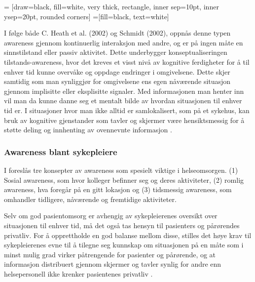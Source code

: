  = [draw=black, fill=white, very thick,
    rectangle, inner sep=10pt, inner ysep=20pt, rounded corners]
 =[fill=black, text=white]
%

\noindent
I følge både C. Heath et al. (2002) og Schmidt (2002), oppnås denne typen awareness gjennom kontinuerlig interaksjon med andre, og er på ingen måte en sinnstilstand eller passiv aktivitet. Dette underbygger konseptualiseringen tilstands-awareness, hvor det kreves et visst nivå av kognitive ferdigheter for å til enhver tid kunne overvåke og oppdage endringer i omgivelsene. Dette skjer samtidig som man synliggjør for omgivelsene ens egen nåværende situasjon gjennom implisitte eller eksplisitte signaler. Med informasjonen man henter inn vil man da kunne danne seg et mentalt bilde av hvordan situasjonen til enhver tid er. I situasjoner hvor man ikke alltid er samlokalisert, som på et sykehus, kan bruk av kognitive gjenstander som tavler og skjermer være hensiktsmessig for å støtte deling og innhenting av ovennevnte informasjon \cite{Bardram04}. 

\subsubsection{Awareness blant sykepleiere}
I \cite{Randell10} foreslås tre konsepter av awareness som spesielt viktige i helseomsorgen. (1) Sosial awareness, som hvor kolleger befinner seg og deres aktiviteter, (2) romlig awareness, hva foregår på en gitt lokasjon og (3) tidsmessig awareness, som omhandler tidligere, nåværende og fremtidige aktiviteter. 

\noindent
Selv om god pasientomsorg er avhengig av sykepleierenes oversikt over situasjonen til enhver tid, må det også tas hensyn til pasienters og pårørendes privatliv. For å opprettholde en god balanse mellom disse, stilles det høye krav til sykepleierenes evne til å tilegne seg kunnskap om situasjonen på en måte som i minst mulig grad virker påtrengende for pasienter og pårørende, og at informasjon distribuert gjennom skjermer og tavler synlig for andre enn helsepersonell ikke krenker pasientenes privatliv \cite{Ebright10}.


